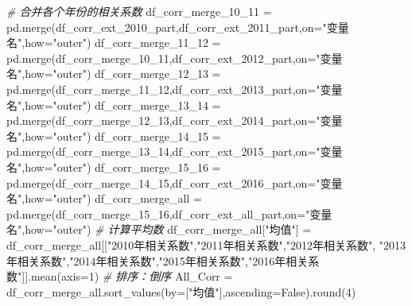 \documentclass[
]{article}
\newenvironment{Shaded}{}{}
\newcommand{\BuiltInTok}[1]{#1}
\newcommand{\CommentTok}[1]{\textcolor[rgb]{0.38,0.63,0.69}{\textit{#1}}}
\newcommand{\DecValTok}[1]{\textcolor[rgb]{0.25,0.63,0.44}{#1}}
\newcommand{\NormalTok}[1]{#1}
\newcommand{\OperatorTok}[1]{\textcolor[rgb]{0.40,0.40,0.40}{#1}}
\newcommand{\StringTok}[1]{\textcolor[rgb]{0.25,0.44,0.63}{#1}}
\newcommand{\VariableTok}[1]{\textcolor[rgb]{0.10,0.09,0.49}{#1}}
\begin{document}
\begin{Shaded}
\begin{Highlighting}[]
\CommentTok{\# 合并各个年份的相关系数}
\NormalTok{df\_corr\_merge\_10\_11 }\OperatorTok{=}\NormalTok{ pd.merge(df\_corr\_ext\_2010\_part,df\_corr\_ext\_2011\_part,on}\OperatorTok{=}\StringTok{"变量名"}\NormalTok{,how}\OperatorTok{=}\StringTok{"outer"}\NormalTok{)}
\NormalTok{df\_corr\_merge\_11\_12 }\OperatorTok{=}\NormalTok{ pd.merge(df\_corr\_merge\_10\_11,df\_corr\_ext\_2012\_part,on}\OperatorTok{=}\StringTok{"变量名"}\NormalTok{,how}\OperatorTok{=}\StringTok{"outer"}\NormalTok{)}
\NormalTok{df\_corr\_merge\_12\_13 }\OperatorTok{=}\NormalTok{ pd.merge(df\_corr\_merge\_11\_12,df\_corr\_ext\_2013\_part,on}\OperatorTok{=}\StringTok{"变量名"}\NormalTok{,how}\OperatorTok{=}\StringTok{"outer"}\NormalTok{)}
\NormalTok{df\_corr\_merge\_13\_14 }\OperatorTok{=}\NormalTok{ pd.merge(df\_corr\_merge\_12\_13,df\_corr\_ext\_2014\_part,on}\OperatorTok{=}\StringTok{"变量名"}\NormalTok{,how}\OperatorTok{=}\StringTok{"outer"}\NormalTok{)}
\NormalTok{df\_corr\_merge\_14\_15 }\OperatorTok{=}\NormalTok{ pd.merge(df\_corr\_merge\_13\_14,df\_corr\_ext\_2015\_part,on}\OperatorTok{=}\StringTok{"变量名"}\NormalTok{,how}\OperatorTok{=}\StringTok{"outer"}\NormalTok{)}
\NormalTok{df\_corr\_merge\_15\_16 }\OperatorTok{=}\NormalTok{ pd.merge(df\_corr\_merge\_14\_15,df\_corr\_ext\_2016\_part,on}\OperatorTok{=}\StringTok{"变量名"}\NormalTok{,how}\OperatorTok{=}\StringTok{"outer"}\NormalTok{)}
\NormalTok{df\_corr\_merge\_all }\OperatorTok{=}\NormalTok{ pd.merge(df\_corr\_merge\_15\_16,df\_corr\_ext\_all\_part,on}\OperatorTok{=}\StringTok{"变量名"}\NormalTok{,how}\OperatorTok{=}\StringTok{"outer"}\NormalTok{)}
\CommentTok{\# 计算平均数}
\NormalTok{df\_corr\_merge\_all[}\StringTok{"均值"}\NormalTok{] }\OperatorTok{=}\NormalTok{ df\_corr\_merge\_all[[}\StringTok{"2010年相关系数"}\NormalTok{,}\StringTok{"2011年相关系数"}\NormalTok{,}\StringTok{"2012年相关系数"}\NormalTok{,}
                                              \StringTok{"2013年相关系数"}\NormalTok{,}\StringTok{"2014年相关系数"}\NormalTok{,}\StringTok{"2015年相关系数"}\NormalTok{,}\StringTok{"2016年相关系数"}\NormalTok{]].mean(axis}\OperatorTok{=}\DecValTok{1}\NormalTok{)}
\CommentTok{\# 排序：倒序}
\NormalTok{All\_Corr }\OperatorTok{=}\NormalTok{ df\_corr\_merge\_all.sort\_values(by}\OperatorTok{=}\NormalTok{[}\StringTok{"均值"}\NormalTok{],ascending}\OperatorTok{=}\VariableTok{False}\NormalTok{).}\BuiltInTok{round}\NormalTok{(}\DecValTok{4}\NormalTok{)}
\end{Highlighting}
\end{Shaded}
\end{document}
